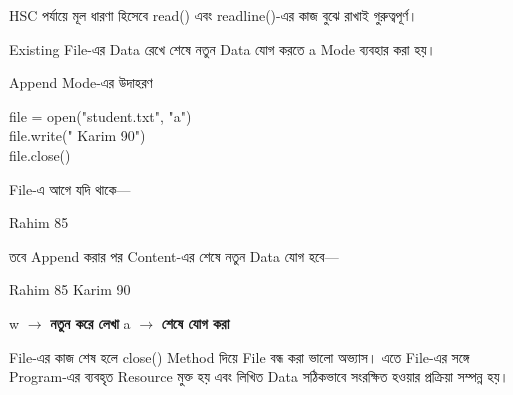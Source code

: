 HSC পর্যায়ে মূল ধারণা হিসেবে
\textenglish{\ttfamily read()} এবং
\textenglish{\ttfamily readline()}-এর কাজ বুঝে রাখাই গুরুত্বপূর্ণ।



Existing File-এর Data রেখে শেষে নতুন Data যোগ করতে
\textenglish{\ttfamily a} Mode ব্যবহার করা হয়।

\begin{codeoutputbox}{Append Mode-এর উদাহরণ}
\noindent
\begin{minipage}[t]{0.54\linewidth}
\vspace{0pt}
\codeheading
\begin{english}
\ttfamily
file = open("student.txt", "a")\\
file.write(" Karim 90")\\
file.close()
\end{english}
\end{minipage}
\hfill
\begin{minipage}[t]{0.42\linewidth}
\vspace{0pt}
\outputheading

File-এ আগে যদি থাকে—

\begin{center}
\textenglish{\ttfamily Rahim 85}
\end{center}

তবে Append করার পর Content-এর শেষে নতুন Data যোগ হবে—

\begin{center}
\textenglish{\ttfamily Rahim 85 Karim 90}
\end{center}
\end{minipage}
\end{codeoutputbox}

\begin{center}
\textenglish{\ttfamily w}
\(\longrightarrow\)
\textbf{নতুন করে লেখা}
\qquad
\textenglish{\ttfamily a}
\(\longrightarrow\)
\textbf{শেষে যোগ করা}
\end{center}



File-এর কাজ শেষ হলে \textenglish{\ttfamily close()} Method দিয়ে File
বন্ধ করা ভালো অভ্যাস। এতে File-এর সঙ্গে Program-এর ব্যবহৃত Resource
মুক্ত হয় এবং লিখিত Data সঠিকভাবে সংরক্ষিত হওয়ার প্রক্রিয়া সম্পন্ন হয়।

